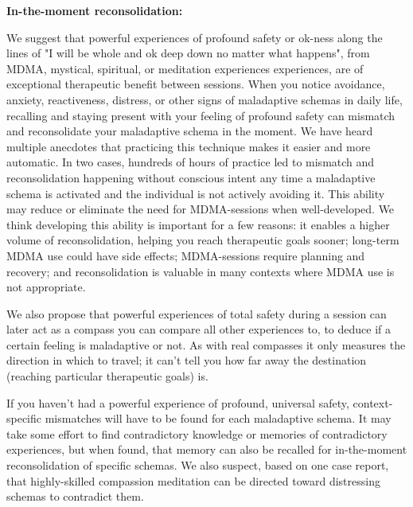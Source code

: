 \documentclass[12pt,letterpaper]{article}
\begin{document}
\noindent \textbf{In-the-moment reconsolidation:}

We suggest that powerful experiences of profound safety or ok-ness along the lines of "I will be whole and ok deep down no matter what happens", from MDMA, mystical, spiritual, or meditation experiences experiences, are of exceptional therapeutic benefit between sessions. When you notice avoidance, anxiety, reactiveness, distress, or other signs of maladaptive schemas in daily life, recalling and staying present with your feeling of profound safety can mismatch and reconsolidate your maladaptive schema in the moment. We have heard multiple anecdotes that practicing this technique makes it easier and more automatic. In two cases, hundreds of hours of practice led to mismatch and reconsolidation happening without conscious intent any time a maladaptive schema is activated and the individual is not actively avoiding it. This ability may reduce or eliminate the need for MDMA-sessions when well-developed. We think developing this ability is important for a few reasons: it enables a higher volume of reconsolidation, helping you reach therapeutic goals sooner; long-term MDMA use could have side effects; MDMA-sessions require planning and recovery; and reconsolidation is valuable in many contexts where MDMA use is not appropriate.

We also propose that powerful experiences of total safety during a session can later act as a compass you can compare all other experiences to, to deduce if a certain feeling is maladaptive or not. As with real compasses it only measures the direction in which to travel; it can’t tell you how far away the destination (reaching particular therapeutic goals) is.

If you haven't had a powerful experience of profound, universal safety, context-specific mismatches will have to be found for each maladaptive schema.  It may take some effort to find contradictory knowledge or memories of contradictory experiences, but when found, that memory can also be recalled for in-the-moment reconsolidation of specific schemas. We also suspect, based on one case report, that highly-skilled compassion meditation can be directed toward distressing schemas to contradict them.
\end{document}
